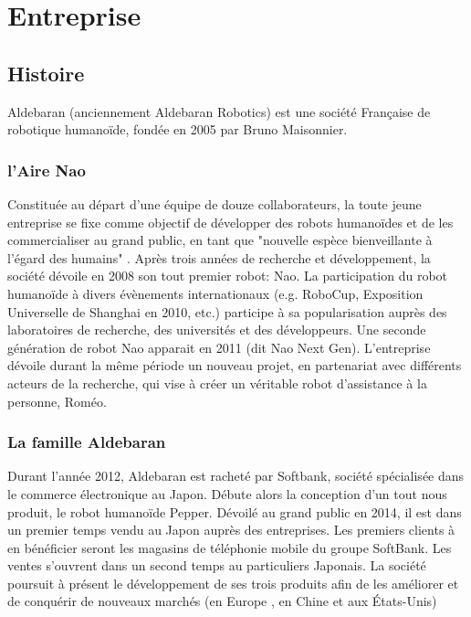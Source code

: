 \chapter{Entreprise}
\label{Entreprise}
\thispagestyle{fancy}

\section{Histoire}
\label{Entreprise: histoire}
Aldebaran (anciennement Aldebaran Robotics) est une société Française de robotique humanoïde, fondée en 2005 par Bruno Maisonnier. 

\subsection{l'Aire Nao}
\label{Entreprise:Histoire:Nao}
Constituée au départ d'une équipe de douze collaborateurs, la toute jeune entreprise se fixe comme objectif de développer des robots humanoïdes et de les commercialiser au grand public, en tant que "nouvelle espèce bienveillante à l'égard des humains" . Après trois années de recherche et développement, la société dévoile en 2008 son tout premier robot: Nao. La participation du robot humanoïde à divers évènements internationaux (e.g. RoboCup, Exposition Universelle de Shanghai en 2010, etc.) participe à sa popularisation auprès des laboratoires de recherche, des universités et des développeurs. Une seconde génération de robot Nao apparait en 2011 (dit Nao Next Gen). L'entreprise dévoile durant la même période un nouveau projet, en partenariat avec différents acteurs de la recherche,  qui vise à créer un véritable robot d'assistance à la personne, Roméo. 

\subsection{La famille Aldebaran}
\label{Entreprise: La famille Aldebaran}
Durant l'année 2012, Aldebaran est racheté par Softbank, société spécialisée dans le commerce électronique au Japon. Débute alors la conception d'un tout nous produit, le robot humanoïde Pepper. Dévoilé au grand public en 2014, il est dans un premier temps vendu au Japon auprès des entreprises. Les premiers clients à en bénéficier seront les magasins de téléphonie mobile du groupe SoftBank. Les ventes s'ouvrent dans un second temps au particuliers Japonais. La société poursuit à présent le développement de ses trois produits afin de les améliorer et de conquérir de nouveaux marchés (en Europe , en Chine et aux États-Unis)

